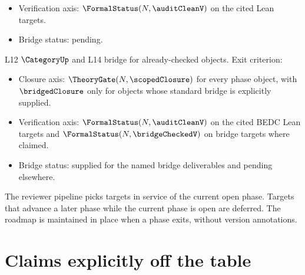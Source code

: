\begin{description}
\begin{itemize}
      \item Verification axis: $\FormalStatus(N, \auditCleanV)$ on the cited Lean targets.
      \item Bridge status: pending.
    \end{itemize}
  \item[\textbf{Phase Category and Bridge}] L12 $\CategoryUp$ and L14 bridge for already-checked objects. Exit criterion:
    \begin{itemize}
      \item Closure axis: $\TheoryGate(N, \scopedClosure)$ for every phase object, with $\bridgedClosure$ only for objects whose standard bridge is explicitly supplied.
      \item Verification axis: $\FormalStatus(N, \auditCleanV)$ on the cited BEDC Lean targets and $\FormalStatus(N, \bridgeCheckedV)$ on bridge targets where claimed.
      \item Bridge status: supplied for the named bridge deliverables and pending elsewhere.
    \end{itemize}
\end{description}

The reviewer pipeline picks targets in service of the current open phase. Targets that advance a later phase while the current phase is open are deferred. The roadmap is maintained in place when a phase exits, without version annotations.

\section{Claims explicitly off the table}
\label{sec:roadmap-off-the-table}

